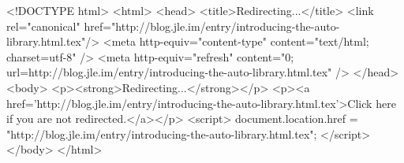 <!DOCTYPE html>
<html>
<head>
<title>Redirecting...</title>
<link rel="canonical" href="http://blog.jle.im/entry/introducing-the-auto-library.html.tex"/>
<meta http-equiv="content-type" content="text/html; charset=utf-8" />
<meta http-equiv="refresh" content="0; url=http://blog.jle.im/entry/introducing-the-auto-library.html.tex" />
</head>
<body>
  <p><strong>Redirecting...</strong></p>
  <p><a href='http://blog.jle.im/entry/introducing-the-auto-library.html.tex'>Click here if you are not redirected.</a></p>
  <script>
    document.location.href = "http://blog.jle.im/entry/introducing-the-auto-library.html.tex";
  </script>
</body>
</html>

